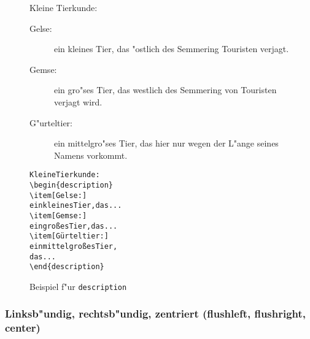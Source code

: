 \begin{figure}[!htbp]  %
\oben{\textwidth}
\exa
Kleine Tierkunde:
\begin{description}
\item[Gelse:]
   ein kleines Tier, das
   "ostlich des Semmering Touristen verjagt.
\item[Gemse:]
   ein gro"ses Tier, das
   westlich des Semmering von Touristen verjagt wird.
\item[G"urteltier:]
   ein mittelgro"ses Tier, das
   hier nur wegen der L"ange seines Namens vorkommt.
\end{description}
\exb
\begin{alltt}
Kleine Tierkunde:
\verb+\begin{description}+
\verb+\item[Gelse:]+
   ein kleines Tier, das ...
\verb+\item[Gemse:]+
   ein gro\ss{}es Tier, das ...
\verb+\item[+G\"urteltier:\verb+]+
   ein mittelgro\ss{}es Tier,
   das ...
\verb+\end{description}+
\end{alltt}
\exc
\unten
\caption{Beispiel f"ur \texttt{description}} \label{desc}
\end{figure}
 
{\hfuzz=2pt\relax %
\subsubsection
          [Flattersatz (flush\-left, flush\-right, center)]
          {Linksb"undig, rechtsb"undig, zentriert
                       (flush\-left, flush\-right, center)}
}

